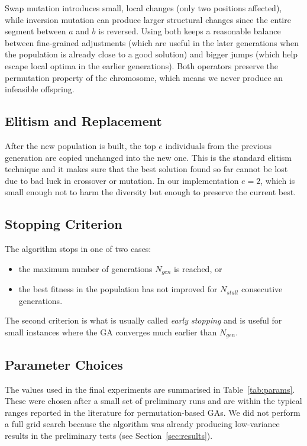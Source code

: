 \documentclass [a4paper, 11pt, titlepage] {article}
\begin{document}
Swap mutation introduces small, local changes (only two positions affected), while inversion mutation can produce larger structural changes since the entire segment between $a$ and $b$ is reversed. Using both keeps a reasonable balance between fine-grained adjustments (which are useful in the later generations when the population is already close to a good solution) and bigger jumps (which help escape local optima in the earlier generations). Both operators preserve the permutation property of the chromosome, which means we never produce an infeasible offspring.

\subsection{Elitism and Replacement}
\label{sec:elitism}

After the new population is built, the top $e$ individuals from the previous generation are copied unchanged into the new one. This is the standard elitism technique and it makes sure that the best solution found so far cannot be lost due to bad luck in crossover or mutation. In our implementation $e = 2$, which is small enough not to harm the diversity but enough to preserve the current best.

\subsection{Stopping Criterion}
\label{sec:stopping}

The algorithm stops in one of two cases:

\begin{itemize}
    \item the maximum number of generations $N_{gen}$ is reached, or
    \item the best fitness in the population has not improved for $N_{stall}$ consecutive generations.
\end{itemize}

The second criterion is what is usually called \emph{early stopping} and is useful for small instances where the GA converges much earlier than $N_{gen}$.

\subsection{Parameter Choices}
\label{sec:params}

The values used in the final experiments are summarised in Table~\ref{tab:params}. These were chosen after a small set of preliminary runs and are within the typical ranges reported in the literature for permutation-based GAs. We did not perform a full grid search because the algorithm was already producing low-variance results in the preliminary tests (see Section~\ref{sec:results}).
\end{document}
